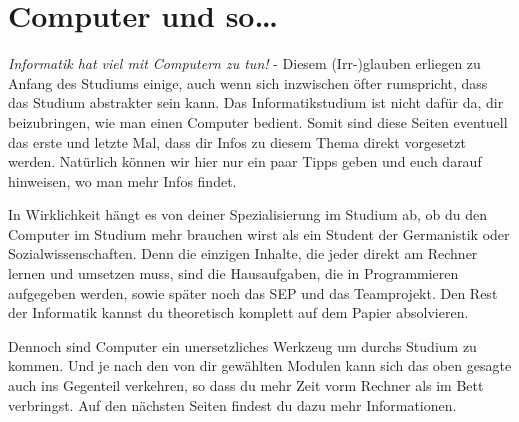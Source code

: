 \section{Computer und so\ldots}
	\label{computer}

\begin{multicols}{2}
	\emph{Informatik hat viel mit Computern zu tun!} - Diesem (Irr-)glauben erliegen zu Anfang des Studiums einige, auch wenn sich inzwischen öfter rumspricht, dass das Studium abstrakter sein kann. Das Informatikstudium ist nicht dafür da, dir beizubringen, wie man einen Computer bedient. Somit sind diese Seiten eventuell das erste und letzte Mal,  dass dir Infos zu diesem Thema direkt vorgesetzt werden. Natürlich können wir hier nur ein paar Tipps geben und euch darauf hinweisen, wo man mehr Infos  findet.

	In Wirklichkeit hängt es von deiner Spezialisierung im Studium ab, ob  du den Computer im Studium mehr brauchen wirst als ein Student der Germanistik oder Sozialwissenschaften. Denn die einzigen Inhalte,  die jeder direkt am Rechner lernen und umsetzen muss, sind die Hausaufgaben,  die in Programmieren aufgegeben werden, sowie später noch das SEP und das Teamprojekt. Den Rest der Informatik kannst du theoretisch komplett auf dem Papier absolvieren.

	Dennoch sind Computer ein unersetzliches Werkzeug um durchs Studium zu kommen. Und je nach den von dir gewählten Modulen kann sich das oben gesagte auch ins Gegenteil verkehren, so dass du mehr Zeit vorm Rechner als im Bett verbringst. Auf den nächsten Seiten findest du dazu mehr Informationen.






\end{multicols}
